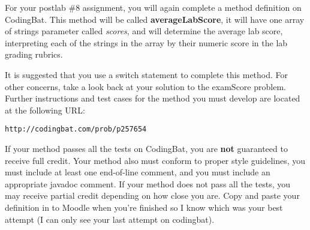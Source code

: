 For your postlab \#8 assignment, you will again complete a method definition on CodingBat. This method will be called \textbf{averageLabScore}, it will have one array of strings parameter called \textit{scores}, and will determine the average lab score, interpreting each of the strings in the array by their numeric score in the lab grading rubrics. 

It is suggested that you use a switch statement to complete this method. For other concerns, take a look back at your solution to the examScore problem. Further instructions and test cases for the method you must develop are located at the following URL:

\begin{verbatim}
http://codingbat.com/prob/p257654
\end{verbatim}

If your method passes all the tests on CodingBat, you are \textbf{not} guaranteed to receive full credit. Your method also must conform to proper style guidelines, you must include at least one end-of-line comment, and you must include an appropriate javadoc comment. If your method does not pass all the tests, you may receive partial credit depending on how close you are. Copy and paste your definition in to Moodle when you're finished so I know which was your best attempt (I can only see your last attempt on codingbat). 

